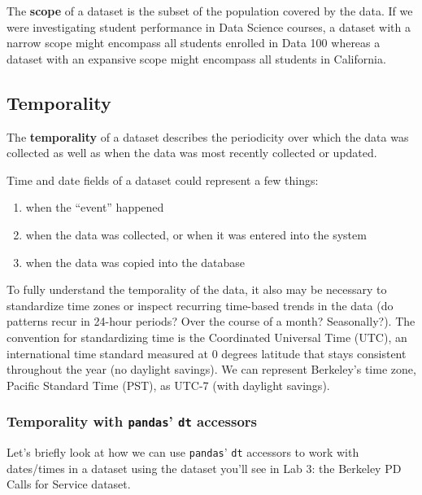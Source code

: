 \documentclass[
  letterpaper,
  DIV=11,
  numbers=noendperiod]{scrreprt}
\providecommand{\tightlist}{%
  \setlength{\itemsep}{0pt}\setlength{\parskip}{0pt}}\usepackage{longtable,booktabs,array}
\begin{document}
The \textbf{scope} of a dataset is the subset of the population covered
by the data. If we were investigating student performance in Data
Science courses, a dataset with a narrow scope might encompass all
students enrolled in Data 100 whereas a dataset with an expansive scope
might encompass all students in California.

\hypertarget{temporality}{%
\subsection{Temporality}\label{temporality}}

The \textbf{temporality} of a dataset describes the periodicity over
which the data was collected as well as when the data was most recently
collected or updated.

Time and date fields of a dataset could represent a few things:

\begin{enumerate}
\def\labelenumi{\arabic{enumi}.}
\tightlist
\item
  when the ``event'' happened
\item
  when the data was collected, or when it was entered into the system
\item
  when the data was copied into the database
\end{enumerate}

To fully understand the temporality of the data, it also may be
necessary to standardize time zones or inspect recurring time-based
trends in the data (do patterns recur in 24-hour periods? Over the
course of a month? Seasonally?). The convention for standardizing time
is the Coordinated Universal Time (UTC), an international time standard
measured at 0 degrees latitude that stays consistent throughout the year
(no daylight savings). We can represent Berkeley's time zone, Pacific
Standard Time (PST), as UTC-7 (with daylight savings).

\hypertarget{temporality-with-pandas-dt-accessors}{%
\subsubsection{\texorpdfstring{Temporality with \texttt{pandas}'
\texttt{dt}
accessors}{Temporality with pandas' dt accessors}}\label{temporality-with-pandas-dt-accessors}}

Let's briefly look at how we can use \texttt{pandas}' \texttt{dt}
accessors to work with dates/times in a dataset using the dataset you'll
see in Lab 3: the Berkeley PD Calls for Service dataset.
\end{document}
